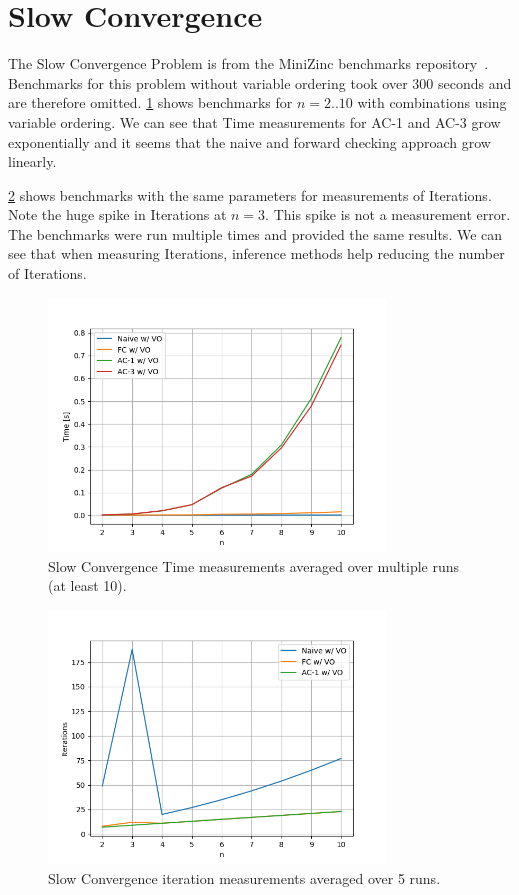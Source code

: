 \section{Slow Convergence}

The Slow Convergence Problem is from the MiniZinc benchmarks repository~\cite{minizinc_slow:2018}. Benchmarks for this problem without variable ordering took over 300 seconds and are therefore omitted. \cref{fig:slow:time-small} shows benchmarks for $n=2..10$ with combinations using variable ordering. We can see that Time measurements for AC-1 and AC-3 grow exponentially and it seems that the naive and forward checking approach grow linearly.

\cref{fig:slow:iterations-small} shows benchmarks with the same parameters for measurements of Iterations. Note the huge spike in Iterations at $n = 3$. This spike is not a measurement error. The benchmarks were run multiple times and provided the same results. We can see that when measuring Iterations, inference methods help reducing the number of Iterations.

\begin{figure}[ht]
	\centering
	\includegraphics[width=0.8\textwidth]{./Problems/slow_convergence/plots/time_small.png}
	\caption{Slow Convergence Time measurements averaged over multiple runs (at least 10).}
	\label{fig:slow:time-small}
\end{figure}

\begin{figure}[ht]
	\centering
	\includegraphics[width=0.8\textwidth]{./Problems/slow_convergence/plots/iterations_small.png}
	\caption{Slow Convergence iteration measurements averaged over 5 runs.}
	\label{fig:slow:iterations-small}
\end{figure}


